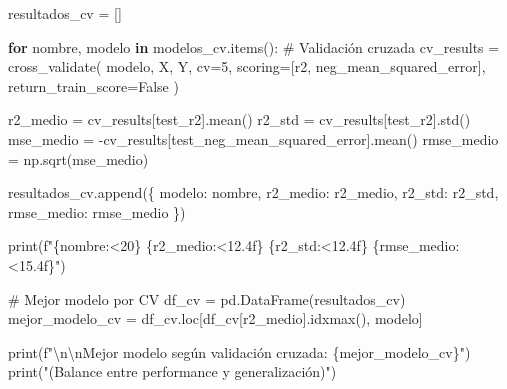 \documentclass[
  doc,
  floatsintext,
  longtable,
  a4paper,
  nolmodern,
  notxfonts,
  notimes,
  12pt,
  colorlinks=true,linkcolor=blue,citecolor=blue,urlcolor=blue]{apa7}
\newenvironment{Shaded}{\begin{snugshade}}{\end{snugshade}}
\newcommand{\BuiltInTok}[1]{\textcolor[rgb]{0.00,0.23,0.31}{#1}}
\newcommand{\CharTok}[1]{\textcolor[rgb]{0.13,0.47,0.30}{#1}}
\newcommand{\CommentTok}[1]{\textcolor[rgb]{0.37,0.37,0.37}{#1}}
\newcommand{\ControlFlowTok}[1]{\textcolor[rgb]{0.00,0.23,0.31}{\textbf{#1}}}
\newcommand{\DecValTok}[1]{\textcolor[rgb]{0.68,0.00,0.00}{#1}}
\newcommand{\KeywordTok}[1]{\textcolor[rgb]{0.00,0.23,0.31}{\textbf{#1}}}
\newcommand{\NormalTok}[1]{\textcolor[rgb]{0.00,0.23,0.31}{#1}}
\newcommand{\OperatorTok}[1]{\textcolor[rgb]{0.37,0.37,0.37}{#1}}
\newcommand{\SpecialCharTok}[1]{\textcolor[rgb]{0.37,0.37,0.37}{#1}}
\newcommand{\SpecialStringTok}[1]{\textcolor[rgb]{0.13,0.47,0.30}{#1}}
\newcommand{\StringTok}[1]{\textcolor[rgb]{0.13,0.47,0.30}{#1}}
\newcommand{\VariableTok}[1]{\textcolor[rgb]{0.07,0.07,0.07}{#1}}
\begin{document}
\begin{Shaded}
\begin{Highlighting}[]
\NormalTok{resultados\_cv }\OperatorTok{=}\NormalTok{ []}

\ControlFlowTok{for}\NormalTok{ nombre, modelo }\KeywordTok{in}\NormalTok{ modelos\_cv.items():}
    \CommentTok{\# Validación cruzada}
\NormalTok{    cv\_results }\OperatorTok{=}\NormalTok{ cross\_validate(}
\NormalTok{        modelo, X, Y,}
\NormalTok{        cv}\OperatorTok{=}\DecValTok{5}\NormalTok{,}
\NormalTok{        scoring}\OperatorTok{=}\NormalTok{[}\StringTok{\textquotesingle{}r2\textquotesingle{}}\NormalTok{, }\StringTok{\textquotesingle{}neg\_mean\_squared\_error\textquotesingle{}}\NormalTok{],}
\NormalTok{        return\_train\_score}\OperatorTok{=}\VariableTok{False}
\NormalTok{    )}
    
\NormalTok{    r2\_medio }\OperatorTok{=}\NormalTok{ cv\_results[}\StringTok{\textquotesingle{}test\_r2\textquotesingle{}}\NormalTok{].mean()}
\NormalTok{    r2\_std }\OperatorTok{=}\NormalTok{ cv\_results[}\StringTok{\textquotesingle{}test\_r2\textquotesingle{}}\NormalTok{].std()}
\NormalTok{    mse\_medio }\OperatorTok{=} \OperatorTok{{-}}\NormalTok{cv\_results[}\StringTok{\textquotesingle{}test\_neg\_mean\_squared\_error\textquotesingle{}}\NormalTok{].mean()}
\NormalTok{    rmse\_medio }\OperatorTok{=}\NormalTok{ np.sqrt(mse\_medio)}
    
\NormalTok{    resultados\_cv.append(\{}
        \StringTok{\textquotesingle{}modelo\textquotesingle{}}\NormalTok{: nombre,}
        \StringTok{\textquotesingle{}r2\_medio\textquotesingle{}}\NormalTok{: r2\_medio,}
        \StringTok{\textquotesingle{}r2\_std\textquotesingle{}}\NormalTok{: r2\_std,}
        \StringTok{\textquotesingle{}rmse\_medio\textquotesingle{}}\NormalTok{: rmse\_medio}
\NormalTok{    \})}
    
    \BuiltInTok{print}\NormalTok{(}\SpecialStringTok{f"}\SpecialCharTok{\{}\NormalTok{nombre}\SpecialCharTok{:\textless{}20\}}\SpecialStringTok{ }\SpecialCharTok{\{}\NormalTok{r2\_medio}\SpecialCharTok{:\textless{}12.4f\}}\SpecialStringTok{ }\SpecialCharTok{\{}\NormalTok{r2\_std}\SpecialCharTok{:\textless{}12.4f\}}\SpecialStringTok{ }\SpecialCharTok{\{}\NormalTok{rmse\_medio}\SpecialCharTok{:\textless{}15.4f\}}\SpecialStringTok{"}\NormalTok{)}

\CommentTok{\# Mejor modelo por CV}
\NormalTok{df\_cv }\OperatorTok{=}\NormalTok{ pd.DataFrame(resultados\_cv)}
\NormalTok{mejor\_modelo\_cv }\OperatorTok{=}\NormalTok{ df\_cv.loc[df\_cv[}\StringTok{\textquotesingle{}r2\_medio\textquotesingle{}}\NormalTok{].idxmax(), }\StringTok{\textquotesingle{}modelo\textquotesingle{}}\NormalTok{]}

\BuiltInTok{print}\NormalTok{(}\SpecialStringTok{f"}\CharTok{\textbackslash{}n\textbackslash{}n}\SpecialStringTok{Mejor modelo según validación cruzada: }\SpecialCharTok{\{}\NormalTok{mejor\_modelo\_cv}\SpecialCharTok{\}}\SpecialStringTok{"}\NormalTok{)}
\BuiltInTok{print}\NormalTok{(}\StringTok{"(Balance entre performance y generalización)"}\NormalTok{)}
\end{Highlighting}
\end{Shaded}
\end{document}
